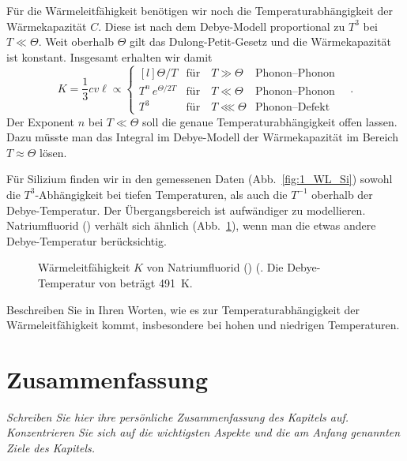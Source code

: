 Für die Wärmeleitfähigkeit benötigen wir noch die Temperaturabhängigkeit der Wärmekapazität $C$. Diese ist nach dem Debye-Modell proportional zu $T^3$ bei $T \ll \Theta$. Weit oberhalb $\Theta$ gilt das Dulong-Petit-Gesetz und die Wärmekapazität ist konstant. Insgesamt erhalten wir damit 
\begin{equation}
    K = \frac{1}{3} c v \ell  \propto 
    \left\{
    \begin{matrix*}[l]
        \Theta / T                    & \text{für} \quad T \gg \Theta    & \text{Phonon--Phonon}      \\
      T^n \,  e^{\Theta / 2T}        & \text{für} \quad T \ll \Theta    & \text{Phonon--Phonon}      \\
      T^3                            & \text{für} \quad T \lll \Theta   & \text{Phonon--Defekt}     
    \end{matrix*}
    \right. \quad .
\end{equation}
Der Exponent $n$ bei $ T \ll \Theta  $ soll die genaue Temperaturabhängigkeit offen lassen. Dazu müsste man das Integral im Debye-Modell der Wärmekapazität im Bereich $T \approx \Theta$ lösen.


Für Silizium finden wir in den gemessenen Daten (Abb.~\ref{fig:1_WL_Si}) sowohl die $T^3$-Abhängigkeit bei tiefen Temperaturen, als auch die $T^{-1}$ oberhalb der Debye-Temperatur. Der Übergangsbereich ist aufwändiger zu modellieren.  Natriumfluorid () verhält sich ähnlich (Abb.~\ref{fig:1_WL_NaF}), wenn man die etwas andere Debye-Temperatur berücksichtig.

\begin{figure}
    \caption{Wärmeleitfähigkeit $K$  von Natriumfluorid () (\cite{Jackson1970}. Die Debye-Temperatur von  beträgt 491~K.}
    \label{fig:1_WL_NaF}
\end{figure}



\begin{questions} 
\item Beschreiben Sie in Ihren Worten, wie es zur Temperaturabhängigkeit der Wärmeleitfähigkeit kommt, insbesondere bei hohen und niedrigen Temperaturen.
\end{questions}
 



\newpage
\section{Zusammenfassung}

\textit{Schreiben Sie hier ihre persönliche Zusammenfassung des Kapitels auf. Konzentrieren Sie sich auf die wichtigsten Aspekte und die am Anfang genannten Ziele des Kapitels.}

\vspace*{10cm}

\printbibliography[segment=\therefsegment,heading=subbibliography]


